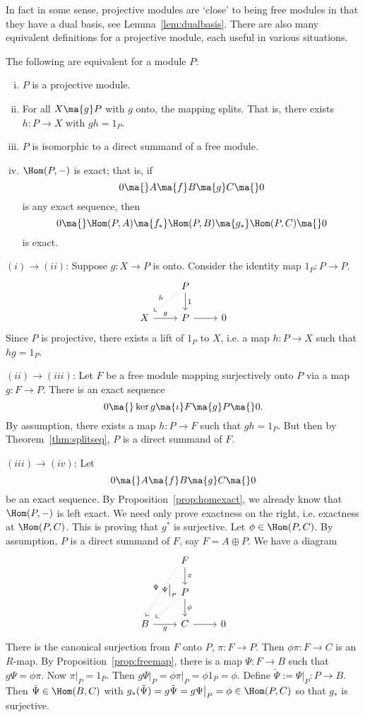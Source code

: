 In fact in some sense, projective modules are `close' to being free modules in that they have a dual basis, see Lemma~\ref{lem:dualbasis}. There are also many equivalent definitions for a projective module, each useful in various situations. 


\begin{prop}\label{sumprojproj}
The following are equivalent for a module $P$:
	\begin{enumerate}[(i)]
	\item $P$ is a projective module.
	\item For all $X \ma{g} P$ with $g$ onto, the mapping splits. That is, there exists $h: P \to X$ with $gh=1_P$.
	\item $P$ is isomorphic to a direct summand of a free module.
	\item $\Hom(P,-)$ is exact; that is, if
		\[
		0 \ma{} A \ma{f} B \ma{g} C \ma{} 0
		\]
is any exact sequence, then
		\[
		0 \ma{} \Hom(P,A) \ma{f_*} \Hom(P,B) \ma{g_*} \Hom(P,C) \ma{} 0
		\]
is exact.
	\end{enumerate}
\end{prop}

\pf $(i)\to(ii)$: Suppose $g: X \to P$ is onto. Consider the identity map $1_P: P \to P$.
	\[
	\begin{tikzcd}
	& P \arrow{d}{1} \arrow[dotted,swap]{dl}{h} &  \\
	X \arrow{r}{g} & P \arrow{r} & 0 
	\end{tikzcd}
	\]
Since $P$ is projective, there exists a lift of $1_P$ to $X$, i.e. a map $h: P \to X$ such that $hg=1_P$. 

$(ii)\to(iii)$: Let $F$ be a free module mapping surjectively onto $P$ via a map $g: F \to P$. There is an exact sequence
	\[
	0 \ma{} \ker g \ma{\iota} F \ma{g} P \ma{} 0.
	\]
By assumption, there exists a map $h: P \to F$ such that $gh=1_P$. But then by Theorem~\ref{thm:splitseq}, $P$ is a direct summand of $F$.

$(iii)\to(iv)$: Let 
	\[
	0 \ma{} A \ma{f} B \ma{g} C \ma{} 0 
	\]
be an exact sequence. By Proposition~\ref{prop:homexact}, we already know that $\Hom(P,-)$ is left exact. We need only prove exactness on the right, i.e. exactness at $\Hom(P,C)$. This is proving that $g^*$ is surjective. Let $\phi \in \Hom(P,C)$. By assumption, $P$ is a direct summand of $F$, say $F= A \oplus P$. We have a diagram
	\[
	\begin{tikzcd}
	& F \arrow{d}{\pi} \arrow[xshift=-1ex,dotted,swap]{ddl}{\Psi} & \\
	& P \arrow{d}{\phi} \arrow[xshift=0.5ex,pos=0.0,swap,dotted]{dl}{\Psi\big|_P} & \\
	B \arrow[swap]{r}{g} & C \arrow{r} & 0 
	\end{tikzcd}
	\]
There is the canonical surjection from $F$ onto $P$, $\pi: F \to P$. Then $\phi\pi: F \to C$ is an $R$-map. By Proposition~\ref{prop:freemap}, there is a map $\Psi: F \to B$ such that $g\Psi=\phi\pi$. Now $\pi\big|_P=1_P$. Then $g\Psi\big|_P=\phi\pi\big|_P=\phi1_P=\phi$. Define $\tilde{\Psi}:=\Psi\big|_P: P \to B$. Then $\tilde{\Psi} \in \Hom(B,C)$ with $g_*(\tilde{\Psi})=g\tilde{\Psi}=g\Psi\big|_P=\phi \in \Hom(P,C)$ so that $g_*$ is surjective. 

